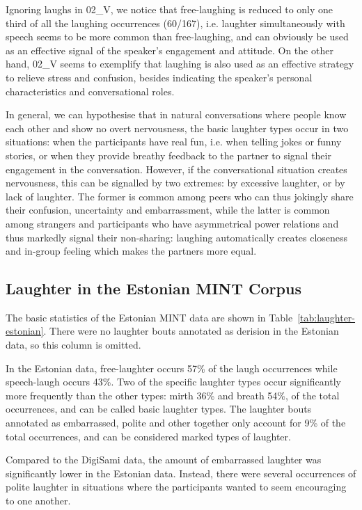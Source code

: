 \documentclass[10pt,journal,compsoc]{IEEEtran}
\begin{document}
Ignoring laughs in 02\_V, we notice that free-laughing is reduced to only one third of all the laughing occurrences (60/167), i.e. laughter simultaneously with speech seems to be more common than free-laughing, and can obviously be used as an effective signal of the speaker's engagement and attitude. On the other hand, 02\_V seems to exemplify that laughing is also used as an effective strategy to relieve stress and confusion, besides indicating the speaker's personal characteristics and conversational roles.

In general, we can hypothesise that in natural conversations where people know each other and show no overt nervousness, the basic laughter types occur in two situations: when the participants have real fun, i.e. when telling jokes or funny stories, or when they provide breathy feedback to the partner to signal their engagement in the conversation. However, if the conversational situation creates nervousness, this can be signalled by two extremes: by excessive laughter, or by lack of laughter. The former is common among peers who can thus jokingly share their confusion, uncertainty and embarrassment, while the latter is common among strangers and participants who have asymmetrical power relations and thus markedly signal their non-sharing: laughing automatically creates closeness and in-group feeling which makes the partners more equal.

\subsection{Laughter in the Estonian MINT Corpus}

The basic statistics of the Estonian MINT data are shown in Table~\ref{tab:laughter-estonian}.
There were no laughter bouts annotated as derision in the Estonian data, so this column is omitted.

In the Estonian data, free-laughter occurs 57\% of the laugh occurrences while speech-laugh occurs 43\%. Two of the specific laughter types occur significantly more frequently than the other types: mirth 36\% and breath 54\%, of the total occurrences, and can be called basic laughter types. The laughter bouts annotated as embarrassed, polite and other together only account for 9\% of the total occurrences, and can be considered marked types of laughter.

Compared to the DigiSami data, the amount of embarrassed laughter was significantly lower in the Estonian data. Instead, there were several occurrences of polite laughter in situations where the participants wanted to seem encouraging to one another.
\end{document}
